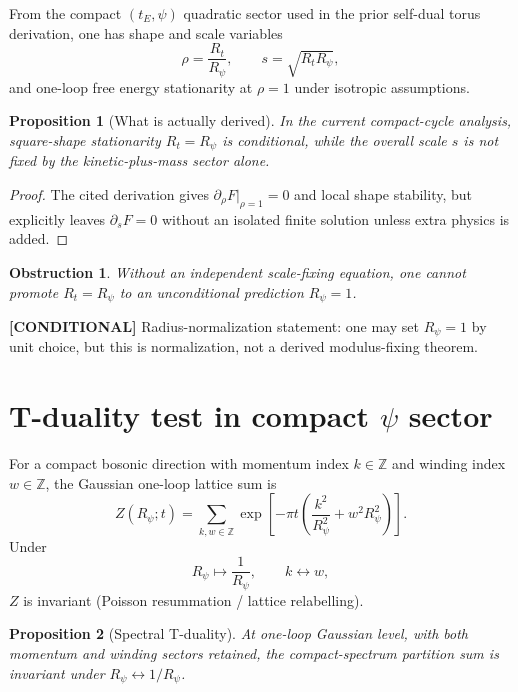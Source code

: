 \documentclass[11pt,a4paper]{article}
\newtheorem{proposition}{Proposition}
\newtheorem{obstruction}{Obstruction}
\newcommand{\cond}[1]{\textbf{[CONDITIONAL]} #1}
\begin{document}
From the compact $(t_E,\psi)$ quadratic sector used in the prior self-dual
torus derivation, one has
shape and scale variables
\begin{equation}
\rho=\frac{R_t}{R_{\psi}},\qquad s=\sqrt{R_tR_{\psi}},
\end{equation}
and one-loop free energy stationarity at $\rho=1$ under isotropic assumptions.

\begin{proposition}[What is actually derived]
In the current compact-cycle analysis, square-shape stationarity
$R_t=R_{\psi}$ is conditional, while the overall scale $s$ is not fixed by the
kinetic-plus-mass sector alone.
\end{proposition}

\begin{proof}
The cited derivation gives $\partial_{\rho}F|_{\rho=1}=0$ and local shape
stability, but explicitly leaves $\partial_sF=0$ without an isolated finite
solution unless extra physics is added.
\end{proof}

\begin{obstruction}
Without an independent scale-fixing equation, one cannot promote
$R_t=R_{\psi}$ to an unconditional prediction $R_{\psi}=1$.
\end{obstruction}

\cond{Radius-normalization statement: one may set $R_{\psi}=1$ by unit choice, but
this is normalization, not a derived modulus-fixing theorem.}

\section{T-duality test in compact $\psi$ sector}

For a compact bosonic direction with momentum index $k\in\mathbb Z$ and winding
index $w\in\mathbb Z$, the Gaussian one-loop lattice sum is
\begin{equation}
Z(R_{\psi};t)=\sum_{k,w\in\mathbb Z}
\exp\!\left[-\pi t\left(\frac{k^2}{R_{\psi}^2}+w^2R_{\psi}^2\right)\right].
\end{equation}
Under
\begin{equation}
R_{\psi}\mapsto \frac{1}{R_{\psi}},\qquad k\leftrightarrow w,
\end{equation}
$Z$ is invariant (Poisson resummation / lattice relabelling).

\begin{proposition}[Spectral T-duality]
At one-loop Gaussian level, with both momentum and winding sectors retained, the
compact-spectrum partition sum is invariant under $R_{\psi}\leftrightarrow 1/R_{\psi}$.
\end{proposition}
\end{document}
